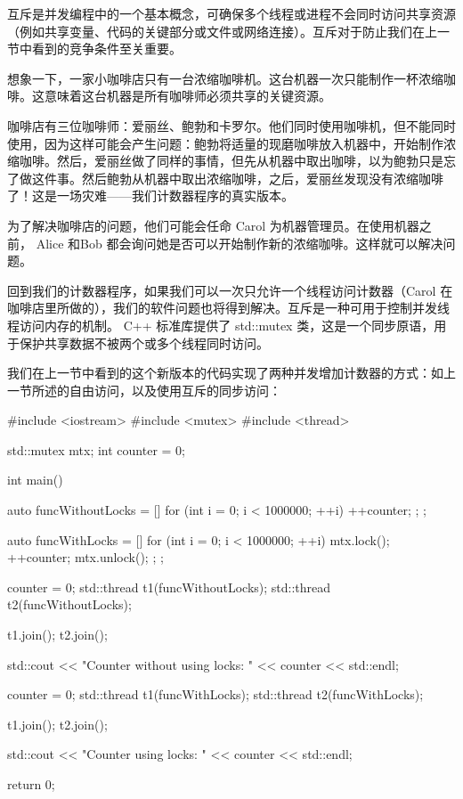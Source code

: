 
互斥是并发编程中的一个基本概念，可确保多个线程或进程不会同时访问共享资源（例如共享变量、代码的关键部分或文件或网络连接）。互斥对于防止我们在上一节中看到的竞争条件至关重要。

想象一下，一家小咖啡店只有一台浓缩咖啡机。这台机器一次只能制作一杯浓缩咖啡。这意味着这台机器是所有咖啡师必须共享的关键资源。

咖啡店有三位咖啡师：爱丽丝、鲍勃和卡罗尔。他们同时使用咖啡机，但不能同时使用，因为这样可能会产生问题：鲍勃将适量的现磨咖啡放入机器中，开始制作浓缩咖啡。然后，爱丽丝做了同样的事情，但先从机器中取出咖啡，以为鲍勃只是忘了做这件事。然后鲍勃从机器中取出浓缩咖啡，之后，爱丽丝发现没有浓缩咖啡了！这是一场灾难——我们计数器程序的真实版本。

为了解决咖啡店的问题，他们可能会任命 Carol 为机器管理员。在使用机器之前， Alice 和Bob 都会询问她是否可以开始制作新的浓缩咖啡。这样就可以解决问题。

回到我们的计数器程序，如果我们可以一次只允许一个线程访问计数器（Carol 在咖啡店里所做的），我们的软件问题也将得到解决。互斥是一种可用于控制并发线程访问内存的机制。 C++ 标准库提供了 std::mutex 类，这是一个同步原语，用于保护共享数据不被两个或多个线程同时访问。

我们在上一节中看到的这个新版本的代码实现了两种并发增加计数器的方式：如上一节所述的自由访问，以及使用互斥的同步访问：

\begin{cpp}
#include <iostream>
#include <mutex>
#include <thread>

std::mutex mtx;
int counter = 0;

int main() {
    auto funcWithoutLocks = [] {
        for (int i = 0; i < 1000000; ++i) {
            ++counter;
        };
    };

    auto funcWithLocks = [] {
        for (int i = 0; i < 1000000; ++i) {
            mtx.lock();
            ++counter;
            mtx.unlock();
        };
    };

    {
        counter = 0;
        std::thread t1(funcWithoutLocks);
        std::thread t2(funcWithoutLocks);

        t1.join();
        t2.join();

        std::cout << "Counter without using locks: " << counter <<
        std::endl;
    } {
        counter = 0;
        std::thread t1(funcWithLocks);
        std::thread t2(funcWithLocks);

        t1.join();
        t2.join();

        std::cout << "Counter using locks: " << counter << std::endl;
    }
    return 0;
}
\end{cpp}

